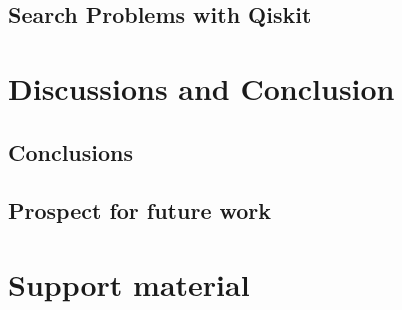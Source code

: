 \documentclass[
oneside,
11pt, a4paper,
footinclude=true,
headinclude=true,
cleardoublepage=empty
]{scrbook}
\begin{document}
\section{Search Problems with Qiskit}


\chapter{Discussions and Conclusion}
\section{Conclusions}
\section{Prospect for future work}







\chapter{Support material}
\end{document}
